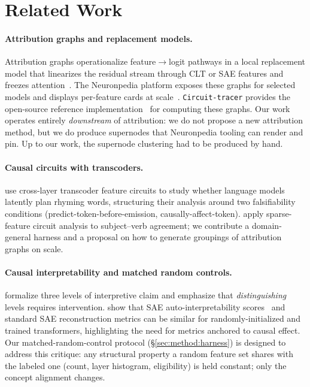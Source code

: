 \section{Related Work}
\label{sec:related}

\paragraph{Attribution graphs and replacement models.}
Attribution graphs operationalize feature$\to$logit pathways in a local replacement model that linearizes the residual stream through CLT or SAE features and freezes attention~\cite{ameisen2025circuittracing,lindsey2025biology}. The Neuronpedia platform exposes these graphs for selected models and displays per-feature cards at scale~\cite{neuronpedia2025,lindsey2025landscape}. \texttt{Circuit-tracer} provides the open-source reference implementation~\cite{circuittracer2025} for computing these graphs. Our work operates entirely \emph{downstream} of attribution: we do not propose a new attribution method, but we do produce supernodes that Neuronpedia tooling can render and pin. Up to our work, the supernode clustering had to be produced by hand.

\paragraph{Causal circuits with transcoders.}
\citet{hannaameisen2026planning} use cross-layer transcoder feature circuits to study whether language models latently plan rhyming words, structuring their analysis around two falsifiability conditions (predict-token-before-emission, causally-affect-token). \citet{marks2024dictionary} apply sparse-feature circuit analysis to subject--verb agreement; we contribute a domain-general harness and a proposal on how to generate groupings of attribution graphs on scale.


\paragraph{Causal interpretability and matched random controls.}
\citet{geiger2025causal} formalize three levels of interpretive claim and emphasize that \emph{distinguishing} levels requires intervention. \citet{heap2025sparse} show that SAE auto-interpretability scores~\cite{bills2023autointerp,paulo2024autointerp} and standard SAE reconstruction metrics can be similar for randomly-initialized and trained transformers, highlighting the need for metrics anchored to causal effect. Our matched-random-control protocol (\S\ref{sec:method:harness}) is designed to address this critique: any structural property a random feature set shares with the labeled one (count, layer histogram, eligibility) is held constant; only the concept alignment changes.
